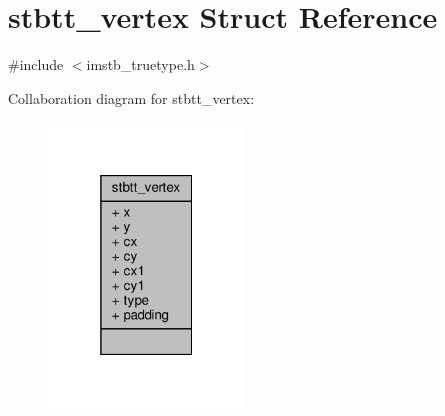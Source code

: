 \hypertarget{structstbtt__vertex}{}\section{stbtt\+\_\+vertex Struct Reference}
\label{structstbtt__vertex}


{\ttfamily \#include $<$imstb\+\_\+truetype.\+h$>$}



Collaboration diagram for stbtt\+\_\+vertex\+:
\nopagebreak
\begin{figure}[H]
\begin{center}
\leavevmode
\includegraphics[width=148pt]{structstbtt__vertex__coll__graph}
\end{center}
\end{figure}
